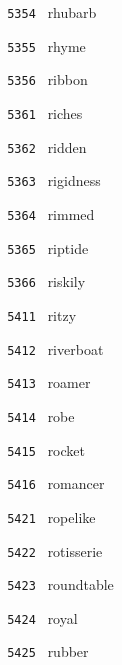 \documentclass[11pt]{article}
\begin{document}
\begin{multicols}{6}
\noindent \texttt{ 5354 } \hspace{1mm} rhubarb  \par
\noindent \texttt{ 5355 } \hspace{1mm} rhyme  \par
\noindent \texttt{ 5356 } \hspace{1mm} ribbon  \par
\noindent \texttt{ 5361 } \hspace{1mm} riches  \par
\noindent \texttt{ 5362 } \hspace{1mm} ridden  \par
\noindent \texttt{ 5363 } \hspace{1mm} rigidness  \par
\noindent \texttt{ 5364 } \hspace{1mm} rimmed  \par
\noindent \texttt{ 5365 } \hspace{1mm} riptide  \par
\noindent \texttt{ 5366 } \hspace{1mm} riskily  \par
\noindent \texttt{ 5411 } \hspace{1mm} ritzy  \par
\noindent \texttt{ 5412 } \hspace{1mm} riverboat  \par
\noindent \texttt{ 5413 } \hspace{1mm} roamer  \par
\noindent \texttt{ 5414 } \hspace{1mm} robe  \par
\noindent \texttt{ 5415 } \hspace{1mm} rocket  \par
\noindent \texttt{ 5416 } \hspace{1mm} romancer  \par
\noindent \texttt{ 5421 } \hspace{1mm} ropelike  \par
\noindent \texttt{ 5422 } \hspace{1mm} rotisserie  \par
\noindent \texttt{ 5423 } \hspace{1mm} roundtable  \par
\noindent \texttt{ 5424 } \hspace{1mm} royal  \par
\noindent \texttt{ 5425 } \hspace{1mm} rubber  \par

\end{multicols}
\end{document}
